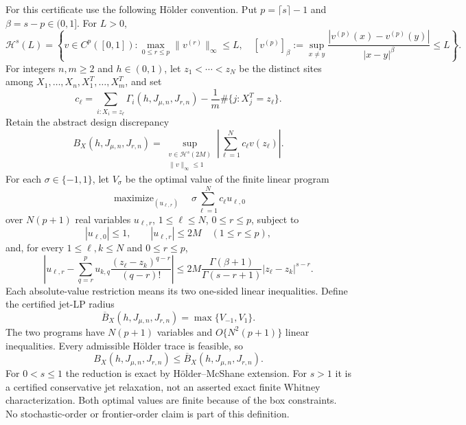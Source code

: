 For this certificate use the following H\"older convention. Put \(p=\lceil s\rceil-1\) and \(\beta=s-p\in(0,1]\). For \(L>0\),
\[
\mathcal H^s(L)=\left\{v\in C^p([0,1]):
\max_{0\le r\le p}\|v^{(r)}\|_\infty\le L,
\quad
[v^{(p)}]_{\beta}:=\sup_{x\ne y}\frac{|v^{(p)}(x)-v^{(p)}(y)|}{|x-y|^\beta}\le L
\right\}.
\]
For integers \(n,m\ge2\) and \(h\in(0,1)\), let \(z_1<\cdots<z_N\) be the distinct sites among \(X_1,\ldots,X_n,X_1^T,\ldots,X_m^T\), and set
\[
c_\ell=\sum_{i:X_i=z_\ell}\Gamma_i(h,J_{\mu,n},J_{r,n})-
\frac1m\#\{j:X_j^T=z_\ell\}.
\]
Retain the abstract design discrepancy
\[
B_X(h,J_{\mu,n},J_{r,n})=
\sup_{\substack{v\in\mathcal H^s(2M)\\ \|v\|_\infty\le1}}
\left|\sum_{\ell=1}^Nc_\ell v(z_\ell)\right|.
\]
For each \(\sigma\in\{-1,1\}\), let \(V_\sigma\) be the optimal value of the finite linear program
\[
\operatorname{maximize}_{(u_{\ell,r})}\quad
\sigma\sum_{\ell=1}^Nc_\ell u_{\ell,0}
\]
over \(N(p+1)\) real variables \(u_{\ell,r}\), \(1\le\ell\le N\), \(0\le r\le p\), subject to
\[
|u_{\ell,0}|\le1,
\qquad
|u_{\ell,r}|\le2M\quad(1\le r\le p),
\]
and, for every \(1\le\ell,k\le N\) and \(0\le r\le p\),
\[
\left|u_{\ell,r}-\sum_{q=r}^p
u_{k,q}\frac{(z_\ell-z_k)^{q-r}}{(q-r)!}\right|
\le
2M\frac{\Gamma(\beta+1)}{\Gamma(s-r+1)}|z_\ell-z_k|^{s-r}.
\]
Each absolute-value restriction means its two one-sided linear inequalities. Define the certified jet-LP radius
\[
\overline B_X(h,J_{\mu,n},J_{r,n})=\max\{V_{-1},V_1\}.
\]
The two programs have \(N(p+1)\) variables and \(O\{N^2(p+1)\}\) linear inequalities. Every admissible H\"older trace is feasible, so
\[
B_X(h,J_{\mu,n},J_{r,n})\le\overline B_X(h,J_{\mu,n},J_{r,n}).
\]
For \(0<s\le1\) the reduction is exact by H\"older--McShane extension. For \(s>1\) it is a certified conservative jet relaxation, not an asserted exact finite Whitney characterization. Both optimal values are finite because of the box constraints. No stochastic-order or frontier-order claim is part of this definition.